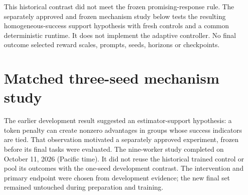 \documentclass[11pt]{article}
\begin{document}
This historical contrast did not meet the frozen promising-response rule. The separately approved and frozen mechanism study below tests the resulting homogeneous-success support hypothesis with fresh controls and a common deterministic runtime. It does not implement the adaptive controller. No final outcome selected reward scales, prompts, seeds, horizons or checkpoints.


\section{Matched three-seed mechanism study}
\label{sec:mechanism}

The earlier development result suggested an estimator-support hypothesis: a token penalty can create nonzero advantages in groups whose success indicators are tied. That observation motivated a separately approved experiment, frozen before its final tasks were evaluated. The nine-worker study completed on October 11, 2026 (Pacific time). It did not reuse the historical trained control or pool its outcomes with the one-seed development contrast. The intervention and primary endpoint were chosen from development evidence; the new final set remained untouched during preparation and training.

\end{document}
